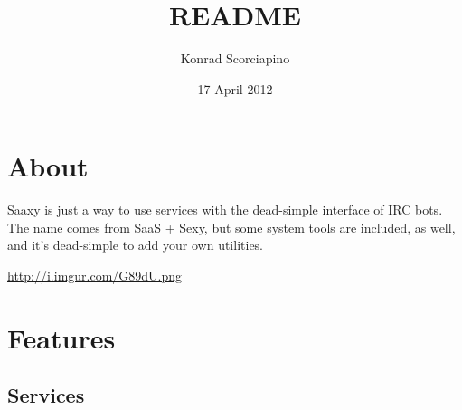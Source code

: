 \documentclass[11pt]{article}
\title{README}
\author{Konrad Scorciapino}
\date{17 April 2012}
\begin{document}
\maketitle

\setcounter{tocdepth}{3}
\tableofcontents
\vspace*{1cm}
\section{About}
\label{sec-1}

  
  Saaxy is just a way to use services with the dead-simple interface of 
  IRC bots. The name comes from SaaS + Sexy, but some system tools are 
  included, as well, and it's dead-simple to add your own utilities.

\href{http://i.imgur.com/G89dU.png}{http://i.imgur.com/G89dU.png}

\section{Features}
\label{sec-2}


\subsection{Services}
\label{sec-2.1}
\end{document}
